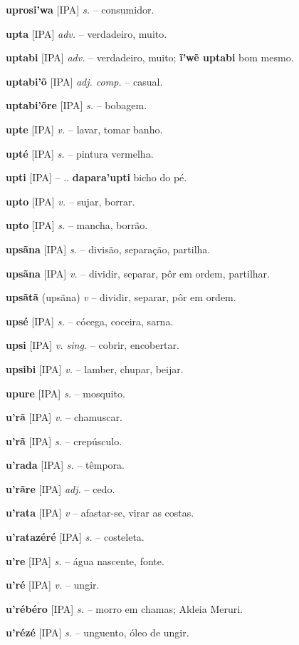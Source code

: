 \textbf{uprosi'wa} [IPA] \textit{s.} -- consumidor.

\textbf{upta} [IPA] \textit{adv.} -- verdadeiro, muito.

\textbf{uptabi} [IPA] \textit{adv.} -- verdadeiro, muito; \textbf{ĩ'wẽ uptabi} bom mesmo.

\textbf{uptabi'õ} [IPA] \textit{adj. comp.} -- casual.

\textbf{uptabi'õre} [IPA] \textit{s.} -- bobagem.

\textbf{upte} [IPA] \textit{v.} -- lavar, tomar banho.

\textbf{upté} [IPA] \textit{s.} -- pintura vermelha.

\textbf{upti} [IPA] \textit{} -- .. \textbf{dapara'upti} bicho do pé.

\textbf{upto} [IPA] \textit{v.} -- sujar, borrar.

\textbf{upto} [IPA] \textit{s.} -- mancha, borrão.

\textbf{upsãna} [IPA] \textit{s.} -- divisão, separação, partilha.

\textbf{upsãna} [IPA] \textit{v.} -- dividir, separar, pôr em ordem, partilhar.

\textbf{upsãtã} (upsãna) \textit{v} -- dividir, separar, pôr em ordem.

\textbf{upsé} [IPA] \textit{s.} -- cócega, coceira, sarna.

\textbf{upsi} [IPA] \textit{v. sing.} -- cobrir, encobertar.

\textbf{upsibi} [IPA] \textit{v.} -- lamber, chupar, beijar.

\textbf{upure} [IPA] \textit{s.} -- mosquito.

\textbf{u'rã} [IPA] \textit{v.} -- chamuscar.

\textbf{u'rã} [IPA] \textit{s.} -- crepúsculo.

\textbf{u'rada} [IPA] \textit{s.} -- têmpora.

\textbf{u'rãre} [IPA] \textit{adj.} -- cedo.

\textbf{u'rata} [IPA] \textit{v} -- afastar-se, virar as costas.

\textbf{u'ratazéré} [IPA] \textit{s.} -- costeleta.

\textbf{u're} [IPA] \textit{s.} -- água nascente, fonte.

\textbf{u'ré} [IPA] \textit{v.} -- ungir.

\textbf{u'rébéro} [IPA] \textit{s.} -- morro em chamas; Aldeia Meruri.

\textbf{u'rézé} [IPA] \textit{s.} -- unguento, óleo de ungir.

